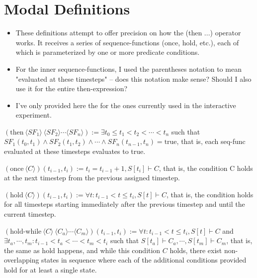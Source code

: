 \documentclass{article}
\begin{document}
\section{Modal Definitions}

\begin{itemize}
    \item These definitions attempt to offer precision on how the (then ...) operator works. It receives a series of sequence-functions (once, hold, etc.), each of which is parameterized by one or more predicate conditions. 

    \item For the inner sequence-functions, I used the parentheses notation to mean "evaluated at these timesteps" -- does this notation make sense? Should I also use it for the entire then-expression? 
    
    \item I've only provided here the for the ones currently used in the interactive experiment. 
\end{itemize}

$(\text{then}\ \langle SF_1 \rangle \ \langle SF_2 \rangle \cdots \langle SF_n \rangle) := \exists t_0 \leq t_1 < t_2 < \cdots < t_n$ such that $SF_1(t_0, t_1) \land SF_2(t_1, t_2) \land \cdots \land SF_n(t_{n-1}, t_n) = \text{true}$, that is, each seq-func evaluated at these timesteps evaluates to true. 

$(\text{once}\ \langle C \rangle)(t_{i-1}, t_i) := t_i = t_{i-1} + 1, S[t_i] \vdash C$, that is, the condition C holds at the next timestep from the previous assigned timestep.

$(\text{hold}\ \langle C \rangle)(t_{i-1}, t_i) := \forall t:  t_{i-1} < t \leq t_i, S[t] \vdash C$, that is, the condition holds for all timesteps starting immediately after the previous timestep and until the current timestep. 

$(\text{hold-while}\ \langle C \rangle \ \langle C_a \rangle \cdots \langle C_m \rangle)(t_{i-1}, t_i) := \forall t:  t_{i-1} < t \leq t_i, S[t] \vdash C$ and $\exists t_a, \cdots, t_m: t_{i-1} < t_a < \cdots < t_m < t_i$ such that $S[t_a] \vdash C_a, \cdots, S[t_m] \vdash C_m$, that is, the same as hold happens, and while this condition $C$ holds, there exist non-overlapping states in sequence where each of the additional conditions provided hold for at least a single state.

\end{document}
